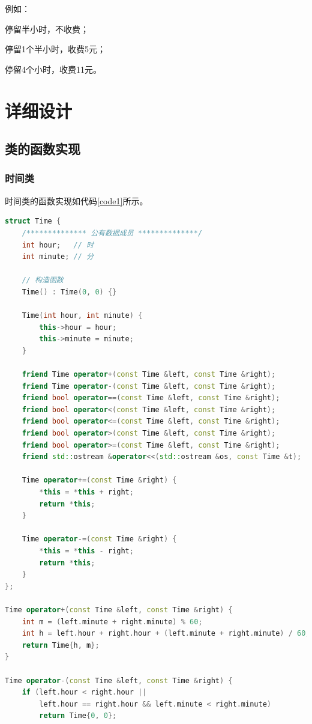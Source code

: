 \documentclass{ctexart}
\begin{document}
    例如：

    停留半小时，不收费；

    停留1个半小时，收费5元；

    停留4个小时，收费11元。
    \section{详细设计}

    \subsection{类的函数实现}
    \subsubsection{时间类}
    时间类的函数实现如代码\ref{code1}所示。
\begin{lstlisting}[language=C++,caption=Time类的实现,label=code1]
struct Time {
    /************** 公有数据成员 **************/
    int hour;   // 时
    int minute; // 分

    // 构造函数
    Time() : Time(0, 0) {}

    Time(int hour, int minute) {
        this->hour = hour;
        this->minute = minute;
    }

    friend Time operator+(const Time &left, const Time &right);
    friend Time operator-(const Time &left, const Time &right);
    friend bool operator==(const Time &left, const Time &right);
    friend bool operator<(const Time &left, const Time &right);
    friend bool operator<=(const Time &left, const Time &right);
    friend bool operator>(const Time &left, const Time &right);
    friend bool operator>=(const Time &left, const Time &right);
    friend std::ostream &operator<<(std::ostream &os, const Time &t);

    Time operator+=(const Time &right) {
        *this = *this + right;
        return *this;
    }

    Time operator-=(const Time &right) {
        *this = *this - right;
        return *this;
    }
};

Time operator+(const Time &left, const Time &right) {
    int m = (left.minute + right.minute) % 60;
    int h = left.hour + right.hour + (left.minute + right.minute) / 60;
    return Time{h, m};
}

Time operator-(const Time &left, const Time &right) {
    if (left.hour < right.hour ||
        left.hour == right.hour && left.minute < right.minute)
        return Time{0, 0};


\end{lstlisting}
\end{document}
